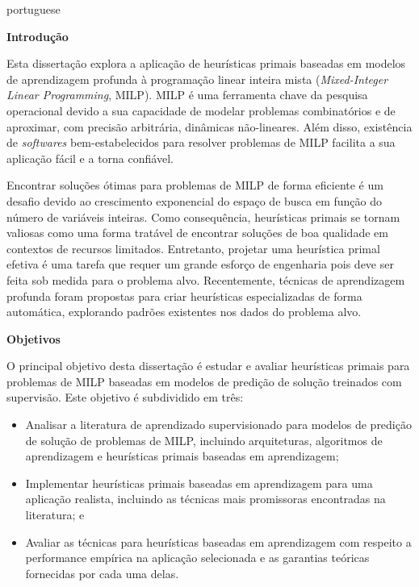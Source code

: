 \begin{resumo}
\begin{otherlanguage*}{portuguese}

\noindent\textbf{\large Introdução}\newline
{\noindent}

Esta dissertação explora a aplicação de heurísticas primais baseadas em modelos de aprendizagem profunda à programação linear inteira mista (\emph{Mixed-Integer Linear Programming}, MILP).
MILP é uma ferramenta chave da pesquisa operacional devido a sua capacidade de modelar problemas combinatórios e de aproximar, com precisão arbitrária, dinâmicas não-lineares.
Além disso, existência de \emph{softwares} bem-estabelecidos para resolver problemas de MILP facilita a sua aplicação fácil e a torna confiável.

Encontrar soluções ótimas para problemas de MILP de forma eficiente é um desafio devido ao crescimento exponencial do espaço de busca em função do número de variáveis inteiras.
Como consequência, heurísticas primais se tornam valiosas como uma forma tratável de encontrar soluções de boa qualidade em contextos de recursos limitados.
Entretanto, projetar uma heurística primal efetiva é uma tarefa que requer um grande esforço de engenharia pois deve ser feita sob medida para o problema alvo.
Recentemente, técnicas de aprendizagem profunda foram propostas para criar heurísticas especializadas de forma automática, explorando padrões existentes nos dados do problema alvo.


\noindent\textbf{\large Objetivos}\newline
{\noindent}

O principal objetivo desta dissertação é estudar e avaliar heurísticas primais para problemas de MILP baseadas em modelos de predição de solução treinados com supervisão.
Este objetivo é subdividido em três:
\begin{itemize}
    \item Analisar a literatura de aprendizado supervisionado para modelos de predição de solução de problemas de MILP, incluindo arquiteturas, algoritmos de aprendizagem e heurísticas primais baseadas em aprendizagem; 
    \item Implementar heurísticas primais baseadas em aprendizagem para uma aplicação realista, incluindo as técnicas mais promissoras encontradas na literatura; e
    \item Avaliar as técnicas para heurísticas baseadas em aprendizagem com respeito a performance empírica na aplicação selecionada e as garantias teóricas fornecidas por cada uma delas.
\end{itemize}


\end{otherlanguage*}
\end{resumo}
